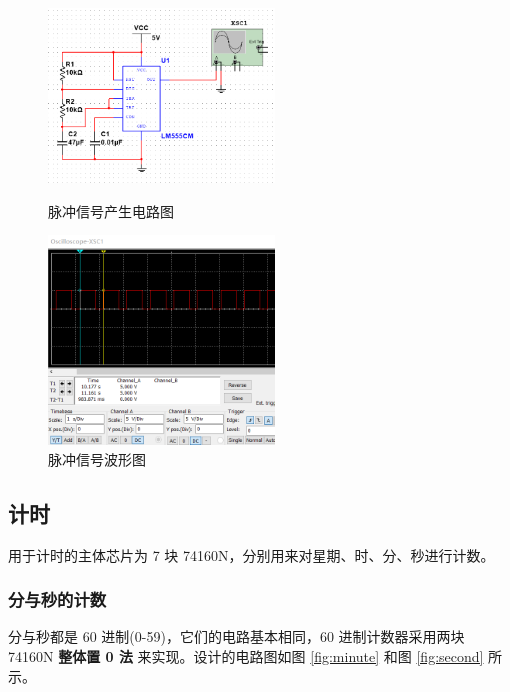 \begin{figure}[htbp]
	\centering
	\begin{minipage}[t]{0.48\textwidth}
		\centering
		\includegraphics[width=6cm]{figure/signal1.png}
		\caption{脉冲信号产生电路图}\label{fig:signal1}
	\end{minipage}
	\begin{minipage}[t]{0.48\textwidth}
		\centering
		\includegraphics[width=6cm]{figure/signal2.png}
		\caption{脉冲信号波形图}\label{fig:signal2}
	\end{minipage}
\end{figure}

\subsection{计时}

用于计时的主体芯片为 7 块 74160N，分别用来对星期、时、分、秒进行计数。

\subsubsection{分与秒的计数}

分与秒都是 60 进制(0-59)，它们的电路基本相同，60 进制计数器采用两块 74160N \textbf{整体置 0 法} 来实现。设计的电路图如图 \ref{fig:minute} 和图 \ref{fig:second} 所示。

